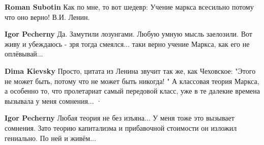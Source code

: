 \begin{itemize}

%

\begin{itemize}


\textbf{Roman Subotin} Как по мне, то вот шедевр:
Учение маркса всесильно потому что оно верно!
В.И. Ленин.

\begin{itemize}
 
\textbf{Igor Pecherny} Да. Замутили лозунгами. Любую умную мысль заелозили. Вот
живу и убеждаюсь - зря тогда смеялся... таки верно учение Маркса, как его не
оплёвывай...


 

\textbf{Dima Kievsky} Просто, цитата из Ленина звучит так же, как Чеховское:
"Этого не может быть, потому что не может быть никогда! " А классовая теория
Маркса, а особенно то, что пролетариат самый передовой класс, уже в те далекие
времена вызывала у меня сомнения...  · 


 
\textbf{Igor Pecherny} Любая теория не без изъяна... У меня тоже это вызывает
сомнения. Зато теорию капитализма и прибавочной стоимости он изложил гениально.
По ней и живём...
\end{itemize}


\end{itemize}
\end{itemize}
